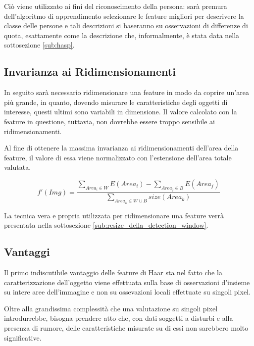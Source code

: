             Ciò viene utilizzato ai fini del riconoscimento della persona: sarà premura dell'algoritmo di apprendimento selezionare le feature migliori per descrivere la classe delle persone e tali descrizioni si baseranno su osservazioni di differenze di quota, esattamente come la descrizione che, informalmente, è stata data nella sottosezione \ref{sub:hasp}.

        \subsection{Invarianza ai Ridimensionamenti} %
        \label{sub:resize_invariance}
            In seguito sarà necessario ridimensionare una feature in modo da coprire un'area più grande, in quanto, dovendo misurare le caratteristiche degli oggetti di interesse, questi ultimi sono variabili in dimensione.
                Il valore calcolato con la feature in questione, tuttavia, non dovrebbe essere troppo sensibile ai ridimensionamenti.

                Al fine di ottenere la massima invarianza ai ridimensionamenti dell'area della feature, il valore di essa viene normalizzato con l'estensione dell'area totale valutata.

                \begin{equation}
                    f'(Img) = \frac
                    {\sum_{Area_i \in W}E(Area_i) - \sum_{Area_j \in B}E(Area_j)}
                    {\sum_{Area_k \in W \cup B}size(Area_k)}
                    \label{eq:haar_scale_invariant}
                \end{equation}

                La tecnica vera e propria utilizzata per ridimensionare una feature verrà presentata nella sottosezione \ref{sub:resize_della_detection_window}.

        \subsection{Vantaggi} %
        \label{sub:haar_feature_vantaggi}
            Il primo indiscutibile vantaggio delle feature di Haar sta nel fatto che la caratterizzazione dell'oggetto viene effettuata sulla base di osservazioni d'insieme su intere aree dell'immagine e non su ossevazioni locali effettuate su singoli pixel.

            Oltre alla grandissima complessità che una valutazione su singoli pixel introdurrebbe, bisogna prendere atto che, con dati soggetti a disturbi e alla presenza di rumore, delle caratteristiche misurate su di essi non sarebbero molto significative.

